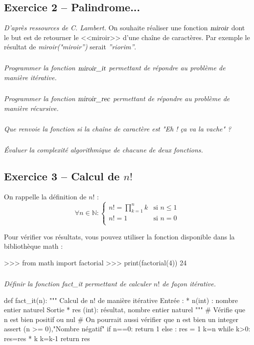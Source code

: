 \documentclass[10pt,fleqn]{article} %
\begin{document}
\begin{multicols}{2}
\subsection*{Exercice 2 -- Palindrome...}
\textit{D'après ressources de C. Lambert.}
\setcounter{subparagraph}{0}
On souhaite réaliser une fonction $\textsl{miroir}$ dont le but est de retourner le <<miroir>> d'une chaîne de caractères. Par exemple le résultat de \textsl{miroir("miroir'')} serait \textsl{''riorim''}.

\subparagraph{}
\textit{Programmer la fonction $\textsl{miroir\_it}$ permettant de répondre au problème de manière itérative.}


\subparagraph{}
\textit{Programmer la fonction $\textsl{miroir\_rec}$ permettant de répondre au problème de manière récursive.}


\subparagraph{}
\textit{Que renvoie la fonction si la chaîne de caractère est "Eh ! ça va la vache" ?}
 
 \subparagraph{}
\textit{Évaluer la complexité algorithmique de chacune de deux fonctions.}

 
\subsection*{Exercice 3 -- Calcul de $n!$}
\setcounter{subparagraph}{0}

\noindent 
On rappelle la définition de $n!$ :
$$
\forall n\in \mathbb{N} : \left\{ \begin{array}{ll}
n!= \prod_{k=1}^n k & \text{si } n\leq1 \\
n!= 1 & \text{si } n=0 \\
\end{array} \right.
$$

\begin{rem}
Pour vérifier vos résultats, vous pouvez utiliser la fonction disponible dans la bibliothèque \textsf{math} : 
\begin{python}
>>> from math import factorial
>>> print(factorial(4)) 
       24
\end{python}
\end{rem}
\subparagraph{}
\textit{Définir la fonction \textsl{fact\_it} permettant de calculer $n!$ de façon itérative.}
\ifprof
\begin{corrige}
\begin{python}
def fact_it(n):
    """
    Calcul de n! de manière itérative
    Entrée : 
     * n(int) : nombre entier naturel
    Sortie 
     * res (int): résultat, nombre entier naturel
    """
    # Vérifie que n est bien positif ou nul
    # On pourrait aussi vérifier que n est bien un integer
    assert (n >= 0),"Nombre négatif" 
    if n==0:
        return 1
    else :
        res = 1
        k=n
        while k>0:
            res=res * k
            k=k-1
        return res
\end{python}
\end{corrige}
\else
\fi



\end{multicols}
\end{document}
